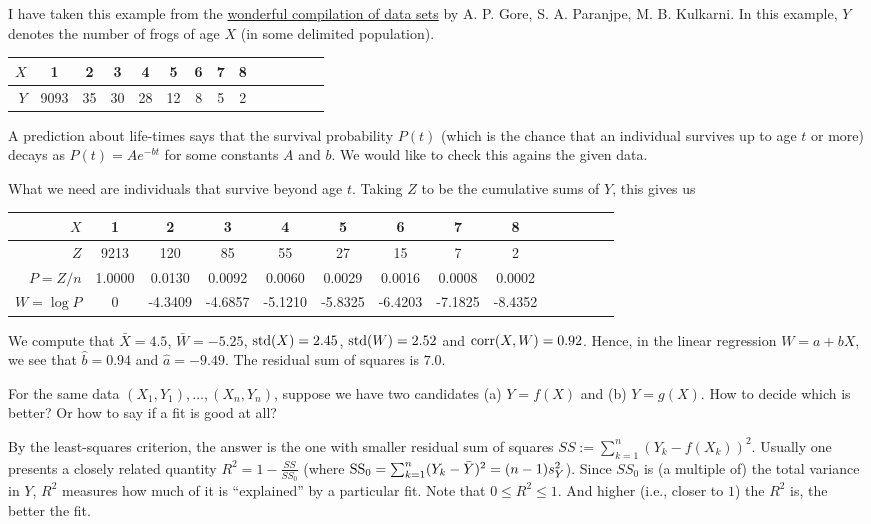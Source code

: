 \documentclass[preprint,  11pt]{amsart}
\begin{document}
\beg I have taken this example from the \href{http://ces.iisc.ernet.in/hpg/nvjoshi/statspunedatabook/databook.html}{ wonderful compilation of data sets} by A. P. Gore, S. A. Paranjpe, M. B. Kulkarni. In this example, $Y$ denotes the number of frogs of age $X$ (in some delimited population).
\begin{center}
\begin{tabular}{||r|c|c|c|c|c|c|c|c|c|c|c|c|c||}
\hline
$X$  & 1 & 2 & 3 & 4 & 5 & 6 & 7 & 8  \\
\hline
$Y$  & 9093 & 35 & 30 & 28 & 12 & 8 & 5 & 2\\
\hline
\hline
\end{tabular}
\end{center}
A prediction about life-times says that the survival probability $P(t)$ (which is the chance that an individual survives up to age $t$ or more) decays as $P(t)=Ae^{-bt}$ for some constants $A$ and $b$. We would like to check this agains the given data.

What we need are individuals that survive beyond age $t$. Taking $Z$ to be the cumulative sums of $Y$, this gives us
\begin{center}
\begin{tabular}{||r|c|c|c|c|c|c|c|c|c|c|c|c|c||}
\hline
$X$  & 1 & 2 & 3 & 4 & 5 & 6 & 7 & 8  \\
\hline
$Z$  & 9213 &  120 & 85 & 55 & 27 & 15 & 7 & 2\\
\hline
$P=Z/n$ & 1.0000  &  0.0130 &   0.0092  &  0.0060  &  0.0029  &  0.0016  &  0.0008  &  0.0002 \\
\hline
$W=\log P$ &  0  & -4.3409  & -4.6857 &  -5.1210  & -5.8325  & -6.4203 &  -7.1825 &  -8.4352 \\
\hline
\hline
\end{tabular}
\end{center}
We compute that $\bar{X}=4.5$, $\bar{W}=-5.25$, $\mbox{std}(X)=2.45$, $\mbox{std}(W)= 2.52$ and $\mbox{corr}(X,W)=0.92$. Hence, in the linear regression $W=a+bX$, we see that $\hat{b}=0.94$ and $\hat{a}=-9.49$. The residual sum of squares is $7.0$.
\eeg

 For the same data $(X_{1},Y_{1}),\ldots ,(X_{n},Y_{n})$, suppose we have two candidates \; (a) \; $Y=f(X)$ and \; (b) \; $Y=g(X)$. How to decide which is better? Or how to say if a fit is good at all?

By the least-squares criterion, the answer is  the one with smaller residual sum of squares $SS:=\sum_{k=1}^{n}(Y_{k}-f(X_{k}))^{2}$. Usually one presents a closely related quantity $R^{2}=1-\frac{SS}{SS_{0}}$ (where $\mbox{SS}_{0}=\sum_{k=1}^{n}(Y_{k}-\bar{Y})^{2}=(n-1)s_{Y}^{2}$). Since $SS_{0}$ is (a multiple of) the total variance in $Y$, $R^{2}$ measures how much of it is ``explained'' by a particular fit. Note that $0\le R^{2}\le 1$. And higher (i.e., closer to $1$) the $R^{2}$ is, the better the fit.
\end{document}
